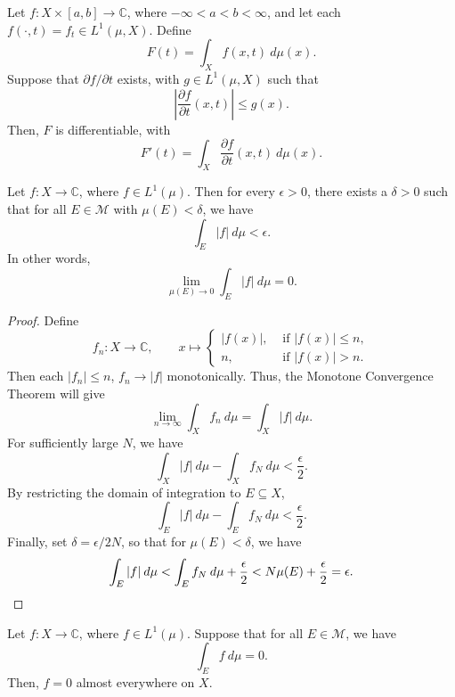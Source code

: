 \documentclass[11pt]{article}
\newcommand{\C}{\mathbb{C}}
\newcommand{\M}{\mathcal{M}}
\newcommand{\pp}[2]{\frac{\partial #1}{\partial #2}}
\theoremstyle{definition}
\theoremstyle{remark}
\numberwithin{equation}{section}
\begin{document}
    \begin{theorem}
        Let $f\colon X \times [a, b] \to \C$, where $-\infty < a < b < \infty$, and
        let each $f(\cdot, t) = f_t \in L^1(\mu, X)$. Define \[
            F(t) = \int_X f(x, t)\:d\mu(x).
        \] Suppose that $\partial f / \partial t$ exists, with $g \in L^1(\mu, X)$
        such that \[
            \left|\pp{f}{t}(x, t)\right| \leq g(x).
        \] Then, $F$ is differentiable, with \[
            F'(t) = \int_X \pp{f}{t}(x, t)\:d\mu(x).
        \]
    \end{theorem}

    \begin{theorem}
        Let $f\colon X \to \C$, where $f \in L^1(\mu)$. Then for every $\epsilon >
        0$, there exists a $\delta > 0$ such that for all $E \in \M$ with $\mu(E) <
        \delta$, we have \[
            \int_E |f|\:d\mu < \epsilon.
        \] In other words, \[
            \lim_{\mu(E) \to 0} \int_E |f|\:d\mu = 0.
        \]
    \end{theorem}
    \begin{proof}
        Define \[
            f_n\colon X \to \C, \qquad x \mapsto \begin{cases}
                |f(x)|, &\text{ if } |f(x)| \leq n, \\
                n, &\text{ if } |f(x)| > n.
            \end{cases}
        \] Then each $|f_n| \leq n$, $f_n \to |f|$ monotonically. Thus, the Monotone
        Convergence Theorem will give \[
            \lim_{n \to \infty} \int_X f_n \:d\mu = \int_X |f|\:d\mu.
        \] For sufficiently large $N$, we have \[
            \int_X |f|\:d\mu - \int_X f_N\:d\mu < \frac{\epsilon}{2}.
        \] By restricting the domain of integration to $E \subseteq X$, \[
            \int_E |f|\:d\mu - \int_E f_N \:d\mu < \frac{\epsilon}{2}.
        \] Finally, set $\delta = \epsilon / 2N$, so that for $\mu(E) < \delta$, we
        have \[
            \int_E |f|\:d\mu < \int_E f_N\:d\mu + \frac{\epsilon}{2} < N\mu(E) +
            \frac{\epsilon}{2} = \epsilon. \qedhere
        \]
    \end{proof}

    \begin{theorem}
        Let $f\colon X \to \C$, where $f \in L^1(\mu)$. Suppose that for all $E \in
        \M$, we have \[
             \int_E f\:d\mu = 0.
        \] Then, $f = 0$ almost everywhere on $X$.
    \end{theorem}
\end{document}
